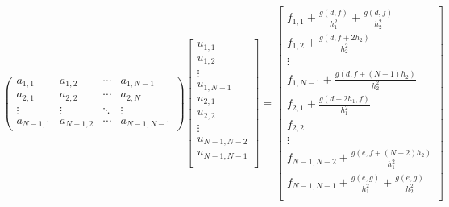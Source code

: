 \documentclass[12pt, letterpaper]{article}
\theoremstyle{plain}
\numberwithin{equation}{section}
\begin{document}
\begin{align*}
\begin{pmatrix}
a_{1,1} & a_{1,2} & \cdots & a_{1,N-1} \\
a_{2,1} & a_{2,2} & \cdots & a_{2,N} \\
\vdots  & \vdots  & \ddots & \vdots  \\
a_{N-1,1} & a_{N-1,2} & \cdots & a_{N-1,N-1} 
\end{pmatrix}
\begin{bmatrix}
  u_{1,1}  \\
  u_{1,2}  \\
  \vdots \\
  u_{1,N-1}  \\
  u_{2,1}  \\
  u_{2,2}  \\
  \vdots \\
  u_{N-1,N-2}  \\
  u_{N-1,N-1}  \\
\end{bmatrix} =
\begin{bmatrix}
f_{1,1}+\frac{g(d,f)}{h_1^2}+\frac{g(d,f)}{h_2^2}  \\
  f_{1,2}+\frac{g(d,f+2h_2)}{h_2^2}  \\
  \vdots \\
  f_{1,N-1}+\frac{g(d,f+(N-1)h_2)}{h_2^2}  \\
  f_{2,1}+\frac{g(d+2h_1,f)}{h_1^2}  \\
  f_{2,2}  \\
  \vdots \\
  f_{N-1,N-2}+\frac{g(e,f+(N-2)h_2)}{h_1^2}  \\
  f_{N-1,N-1}+\frac{g(e,g)}{h_1^2}+\frac{g(e,g)}{h_2^2}  \\
\end{bmatrix}
\end{align*}


\end{document}
